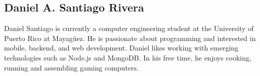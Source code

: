 \subsection*{Daniel A. Santiago Rivera}

Daniel Santiago is currently a computer engineering student at the University of
Puerto Rico at Mayagüez. He is passionate about programming and interested in
mobile, backend, and web development. Daniel likes working with emerging
technologies such as Node.js and MongoDB. In his free time, he enjoys cooking,
running and assembling gaming computers.
